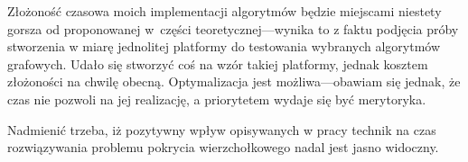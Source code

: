 \begin{note}
  Złożoność czasowa moich implementacji algorytmów będzie miejscami niestety
  gorsza od proponowanej w~części teoretycznej---wynika to z faktu podjęcia
  próby stworzenia w miarę jednolitej platformy do testowania wybranych
  algorytmów grafowych.
  Udało się stworzyć coś na wzór takiej platformy, jednak kosztem złożoności na
  chwilę obecną.
  Optymalizacja jest możliwa---obawiam się jednak, że czas nie pozwoli na jej
  realizację, a priorytetem wydaje się być merytoryka.

  Nadmienić trzeba, iż pozytywny wpływ opisywanych w pracy technik na czas
  rozwiązywania problemu pokrycia wierzchołkowego nadal jest jasno widoczny.
\end{note}
